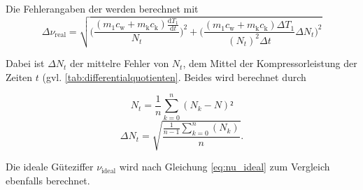 Die Fehlerangaben der werden berechnet mit
\begin{equation}
\Delta{\nu_\mathup{real}}=\sqrt{\biggl(\frac{(m_1c_\mathup{w}+m_\mathup{k}c_\mathup{k})\frac{\mathup{d}T_1}{\mathup{d}{t}}}{N_t}\biggr)^2+\biggl(\frac{(m_1c_\mathup{w}+m_\mathup{k}c_\mathup{k})\Delta{T_1}}{(N_t)^2 \Delta{t}}\Delta{N_t}\biggr)^2}
\end{equation}

Dabei ist $\Delta{N_t}$ der mittelre Fehler von $N_t$, dem Mittel der Kompressorleistung der Zeiten $t$ (gvl. \ref{tab:differentialquotienten}. Beides wird berechnet durch

\begin{equation}
	N_t=\frac{1}{n}\sum_{k=0}^n{(N_k-N)²}
\end{equation}
\begin{equation}
	\Delta{N_t}=\sqrt{\frac{\frac{1}{n-1}\sum_{k=0}^n(N_k)}{n}}.
\end{equation}

Die ideale Güteziffer $\nu_\mathup{ideal}$ wird nach Gleichung \eqref{eq:nu_ideal} zum Vergleich ebenfalls berechnet.


	


